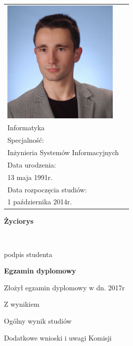 \documentclass[12pt,a4paper,twoside]{report}
\begin{document}
  \begin{tabular}{p{6cm} p{8cm}}
  \begin{minipage}{7cm}
  \includegraphics[height=6cm, keepaspectratio]{img/author-photo.jpg}
  \end{minipage}
  &
  \begin{minipage}{8cm}
  Kierunek: \\[\smallskipamount]
  {\large Informatyka}\\[0.2cm]
  Specjalność: \\[\smallskipamount]
  {\large Inżynieria Systemów Informacyjnych}\\[0.2cm]
  Data urodzenia: \\[\smallskipamount]
  {\large 13 maja 1991r.}\\[0.2cm]
  Data rozpoczęcia studiów: \\[\smallskipamount]
  {\large 1 października 2014r.}
  \end{minipage}
  \end{tabular}
  \vspace*{1\baselineskip}
  \begin{center}
  {\large\bfseries Życiorys}\par\bigskip
  \end{center}

  \indent

  \vspace{2\baselineskip}
  \hfill\parbox{15em}{{\small\dotfill}\\[-.3ex]
  \centerline{\footnotesize podpis studenta}}\par
  \vspace{2\baselineskip}
  \begin{center}
  {\large\bfseries Egzamin dyplomowy} \par\bigskip\bigskip
  \end{center}
  \par\noindent\vspace{1.5\baselineskip}
  Złożył egzamin dyplomowy w dn. \dotfill 2017r
  \par\noindent\vspace{1.5\baselineskip}
  Z wynikiem \dotfill
  \par\noindent\vspace{1.5\baselineskip}
  Ogólny wynik studiów \dotfill
  \par\noindent\vspace{1.5\baselineskip}
  Dodatkowe wnioski i uwagi Komisji \dotfill
  \par\noindent\vspace{1.5\baselineskip}
  \dotfill
\end{document}
